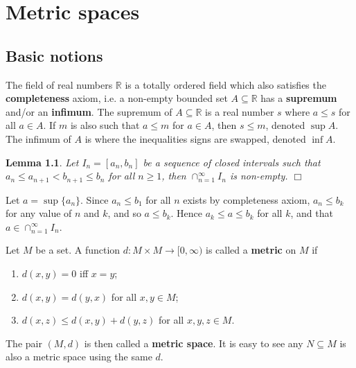 \documentclass[letter-paper]{tufte-book}
\newtheorem{lemma}[theorem]{\color{pastel-blue}Lemma}
\newenvironment{proof}[1][Proof]{\begin{trivlist}
\item[\hskip \labelsep {\bfseries #1}]}{\end{trivlist}}
\newcommand{\qedwhite}{\hfill \ensuremath{\Box}}
\begin{document}

\chapter{Metric spaces}


\section{Basic notions}

The field of real numbers $\mathbb{R}$ is a totally ordered field which also
satisfies the \textbf{completeness} axiom, i.e. a non-empty bounded set $A
\subseteq \mathbb{R}$ has a \textbf{supremum} and/or an \textbf{infimum}. The
supremum of $A\subseteq\mathbb{R}$ is a real number $s$ where $a\leq s$ for all
$a\in A$. If $m$ is also such that $a \leq m$ for $a \in A$, then $s\leq m$,
denoted $\sup A$. The infimum of $A$ is where the inequalities signs are
swapped, denoted $\inf A$.

\begin{lemma}\label{lem:intervals}
  Let $I_n = [a_n, b_n]$ be a sequence of closed intervals such that $a_n \leq
  a_{n+1} < b_{n+1} \leq b_n$ for all $n\geq 1$, then $\cap_{n=1}^\infty I_n$ is
  non-empty. \qedwhite
\end{lemma}

\begin{proof}
  Let $a = \sup\{ a_n \}$. Since $a_n \leq b_1$ for all $n$ exists by
  completeness axiom, $a_n \leq b_k$ for any value of $n$ and $k$, and so $a\leq
  b_k$. Hence $a_k \leq a \leq b_k$ for all $k$, and that $a \in
  \cap_{n=1}^\infty I_n$.
\end{proof}

Let $M$ be a set. A function $d : M\times M \to [0, \infty)$ is called a
\textbf{metric} on $M$ if
\begin{enumerate}
  \item $d(x, y) = 0$ iff $x = y$;
  \item $d(x, y) = d(y, x)$ for all $x,y\in M$;
  \item $d(x, z) \leq d(x, y) + d(y, z)$ for all $x, y, z \in M$.
\end{enumerate}
The pair $(M, d)$ is then called a \textbf{metric space}. It is easy to see
any $N\subseteq M$ is also a metric space using the same $d$.
\end{document}
